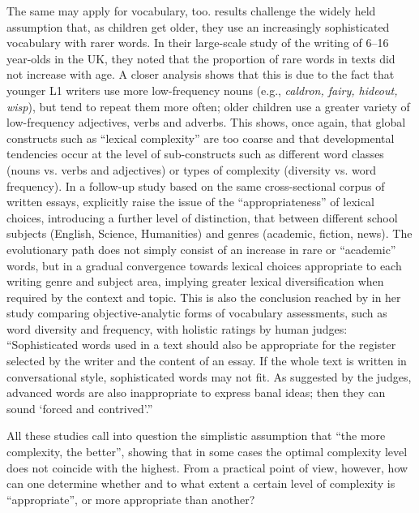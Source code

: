 \documentclass[output=paper]{langscibook}
\begin{document}
The same may apply for vocabulary, too.  results challenge the widely held assumption that, as children get older, they use an increasingly sophisticated vocabulary with rarer words. In their large-scale study of the writing of 6--16 year-olds in the UK, they noted that the proportion of rare words in texts did not increase with age. A closer analysis shows that this is due to the fact that younger L1 writers use more low-frequency nouns (e.g., \textit{caldron, fairy, hideout, wisp}), but tend to repeat them more often; older children use a greater variety of low-frequency adjectives, verbs and adverbs. This shows, once again, that global constructs such as “lexical complexity” are too coarse and that developmental tendencies occur at the level of sub-constructs such as different word classes (nouns vs. verbs and adjectives) or types of complexity (diversity vs. word frequency). In a follow-up study based on the same cross-sectional corpus of written essays, \citet{DurrantDurrant2022} explicitly raise the issue of the “appropriateness” of lexical choices, introducing a further level of distinction, that between different school subjects (English, Science, Humanities) and genres (academic, fiction, news). The evolutionary path does not simply consist of an increase in rare or “academic” words, but in a gradual convergence towards lexical choices appropriate to each writing genre and subject area, implying greater lexical diversification when required by the context and topic. This is also the conclusion reached by \citet[222]{Leńko-Szymańska2021} in her study comparing objective-analytic forms of vocabulary assessments, such as word diversity and frequency, with holistic ratings by human judges: “Sophisticated words used in a text should also be appropriate for the register selected by the writer and the content of an essay. If the whole text is written in conversational style, sophisticated words may not fit. As suggested by the judges, advanced words are also inappropriate to express banal ideas; then they can sound `forced and contrived'.” 

All these studies call into question the simplistic assumption that “the more complexity, the better”, showing that in some cases the optimal complexity level does not coincide with the highest. From a practical point of view, however, how can one determine whether and to what extent a certain level of complexity is “appropriate”, or more appropriate than another? 
\end{document}
